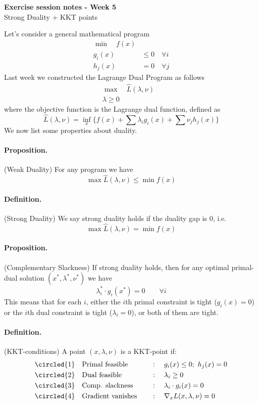 \documentclass[answers]{exam}
\begin{document}
	$ $
	\begin{center}
		\huge \textbf{Exercise session notes - Week 5}  \\ \vspace*{3mm}
        \Large{Strong Duality + KKT points}
	\end{center}
	$ $\\

    \noindent Let's consider a general mathematical program
    \begin{align*}
        \min \quad f(x) & \\ 
        g_i(x) &\leq 0 \quad\forall i\\
        h_j(x) &= 0 \quad\forall j
    \end{align*}
    Last week we constructed the Lagrange Dual Program as follows 
    \begin{align*}
        \max \quad \hat{L}(\lambda, \nu)& \\ 
        \lambda \geq 0
    \end{align*}
    where the objective function is the Lagrange dual function, defined as 
    $$ \hat{L}(\lambda, \nu) = \inf_x\Big\{ f(x) + \sum \lambda_i g_i(x) + \sum \nu_j h_j(x)\Big\} $$
    We now list some properties about duality. \\
    \paragraph{Proposition.} (Weak Duality) For any program we have 
    $$\max \hat{L}(\lambda, \nu) \leq \min f(x)$$
    \paragraph{Definition.} (Strong Duality) We say strong duality holds if the duality gap is $0$, i.e.  
    $$\max \hat{L}(\lambda, \nu) = \min f(x)$$
    \paragraph{Proposition.} (Complementary Slackness) If strong duality holds, then for any optimal primal-dual solution $(x^*, \lambda^*, \nu^*)$ we have 
    $$\lambda_i^* \cdot g_i(x^*) = 0\quad\quad \forall i $$
    This means that for each $i$, either the $i$th primal constraint is tight ($g_i(x) = 0$) or the $i$th dual constraint is tight ($\lambda_i = 0$), or both of them are tight. 
    \paragraph{Definition.} (KKT-conditions) A point $(x,\lambda, \nu)$ is a KKT-point if:
    \begin{alignat*}{3}
        \circled{1}\quad &\text{Primal feasible}\quad &&:\quad g_i(x)\leq 0;\ h_j(x) = 0 \\ 
        \circled{2}\quad &\text{Dual feasible}\quad &&: \quad \lambda_i\geq 0 \\
        \circled{3}\quad &\text{Comp. slackness}\quad &&: \quad \lambda_i\cdot g_i(x) = 0 \\ 
        \circled{4}\quad &\text{Gradient vanishes}\quad &&:\quad \nabla_x L(x,\lambda, \nu) = 0
    \end{alignat*}
\end{document}
